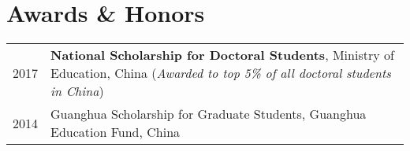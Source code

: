 \section*{Awards \& Honors}

\begin{tabular}{p{} p{}}
2017 & \textbf{National Scholarship for Doctoral Students}, Ministry of Education, China \newline
        (\textit{Awarded to top 5\% of all doctoral students in China}) \\
2014 & Guanghua Scholarship for Graduate Students, Guanghua Education Fund, China \\
\end{tabular}
